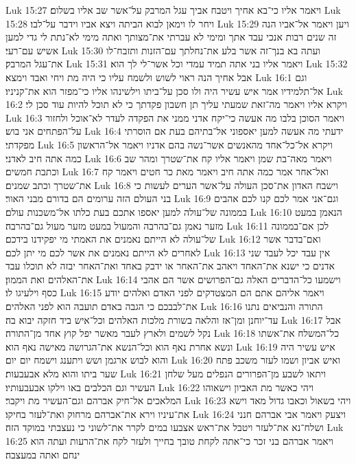Luk 15:27  ויאמר אליו כי־בא אחיך ויטבח אביך עגל המרבק על־אשר שב אליו בשלום׃
Luk 15:28  ויחר לו וימאן לבוא הביתה ויצא אביו וידבר על־לבו׃
Luk 15:29  ויען ויאמר אל־אביו הנה זה שנים רבות אנכי עבד אתך ומימי לא עברתי את־מצותך ואתה מימי לא־נתת לי גדי למען אשיש עם־רעי׃
Luk 15:30  ועתה בא בנך־זה אשר בלע את־נחלתך עם־הזנות ותזבח־לו את־עגל המרבק׃
Luk 15:31  ויאמר אליו בני אתה תמיד עמדי וכל אשר־לי לך הוא׃
Luk 15:32  אבל אחיך הנה ראוי לשוש ולשמח עליו כי היה מת ויחי ואבד וימצא׃
Luk 16:1  וגם אל־תלמידיו אמר איש עשיר היה ולו סכן על־ביתו וילשינהו אליו כי־מפזר הוא את־קניניו׃
Luk 16:2  ויקרא אליו ויאמר מה־זאת שמעתי עליך תן חשבון פקדתך כי לא תוכל להיות עוד סכן לי׃
Luk 16:3  ויאמר הסוכן בלבו מה אעשה כי־יקח אדני ממני את הפקדה לעדר לא־אוכל ולחזור על־הפתחים אני בוש׃
Luk 16:4  ידעתי מה אעשה למען יאספוני אל־בתיהם בעת אם הוסרתי מפקדתי׃
Luk 16:5  ויקרא אל־כל־אחד מהאנשים אשר־נשה בהם אדניו ויאמר אל־הראשון כמה אתה חיב לאדני׃
Luk 16:6  ויאמר מאה־בת שמן ויאמר אליו קח את־שטרך ומהר שב וכתבת חמשים׃
Luk 16:7  ואל־אחר אמר כמה אתה חיב ויאמר מאת כר חטים ויאמר קח את־שטרך וכתב שמנים׃
Luk 16:8  וישבח האדון את־סכן העולה על־אשר הערים לעשות כי בני העולם הזה ערומים הם בדורם מבני האור׃
Luk 16:9  וגם־אני אמר לכם קנו לכם אהבים בממונה של־עולה למען יאספו אתכם בעת כלתו אל־משכנות עולם׃
Luk 16:10  הנאמן במעט מזער נאמן גם־בהרבה והמעול במעט מזער מעול גם־בהרבה׃
Luk 16:11  לכן אם־בממונה של־עולה לא הייתם נאמנים את האמתי מי יפקידנו בידכם׃
Luk 16:12  ואם־בדבר אשר לאחרים לא הייתם נאמנים את אשר לכם מי יתן לכם׃
Luk 16:13  אין עבד יכל לעבד שני אדנים כי ישנא את־האחד ויאהב את־האחר או ידבק באחד ואת־האחר יבזה לא תוכלו עבד את־האלהים ואת הממון׃
Luk 16:14  וישמעו כל־הדברים האלה גם־הפרושים אשר הם אהבי כסף וילעיגו לו׃
Luk 16:15  ויאמר אליהם אתם הם המצטדקים לפני האדם ואלהים יודע את־לבבכם כי הגבה באדם תועבה הוא לפני האלהים׃
Luk 16:16  התורה והנביאים נתנו עד־יוחנן ומן־אז והלאה בשורת מלכות האלהים וכל־איש ביד חזקה יבוא בה׃
Luk 16:17  אבל נקל לשמים ולארץ לעבר מאשר יפל קוץ אחד מן־התורה׃
Luk 16:18  כל־המשלח את־אשתו ונשא אחרת נאף הוא וכל־הנשא את־הגרושה מאישה נאף הוא׃
Luk 16:19  איש עשיר היה והוא לבוש ארגמן ושש ויתענג וישמח יום יום׃
Luk 16:20  ואיש אביון ושמו לעזר משכב פתח שער ביתו והוא מלא אבעבעות׃
Luk 16:21  ויתאו לשבע מן־הפרורים הנפלים מעל שלחן העשיר וגם הכלבים באו וילקו אבעבעותיו׃
Luk 16:22  ויהי כאשר מת האביון וישאוהו המלאכים אל־חיק אברהם וגם־העשיר מת ויקבר׃
Luk 16:23  ויהי בשאול וכאבו גדול מאד וישא את־עיניו וירא את־אברהם מרחוק ואת־לעזר בחיקו׃
Luk 16:24  ויצעק ויאמר אבי אברהם חנני ושלח־נא את־לעזר ויטבל את־ראש אצבעו במים לקרר את־לשוני כי נעצבתי במוקד הזה׃
Luk 16:25  ויאמר אברהם בני זכר כי־אתה לקחת טובך בחייך ולעזר לקח את־הרעות ועתה הוא ינחם ואתה במעצבה׃
